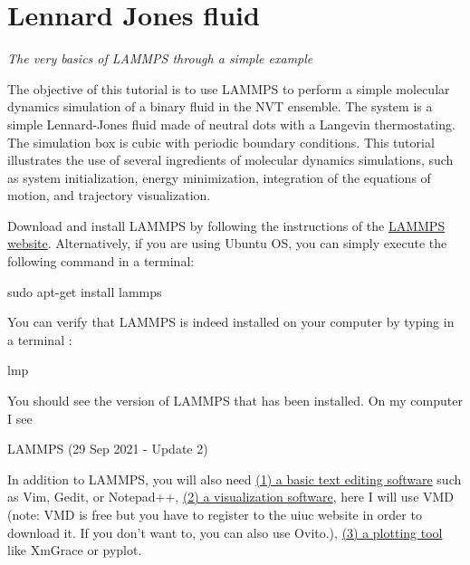 \chapter{Lennard Jones fluid}

\vspace{-1cm} \noindent \textcolor{graytitle}{\textit{{\Large The very basics of LAMMPS through a simple example}}\vspace{0.5cm} }

\noindent The objective of this tutorial is to use
LAMMPS to perform a simple molecular dynamics simulation
of a binary fluid in the NVT ensemble. The system is a simple Lennard-Jones fluid
made of neutral dots with a Langevin thermostating. The
simulation box is cubic with periodic boundary conditions.
This tutorial illustrates the use of several ingredients of
molecular dynamics simulations, such as system initialization,
energy minimization, integration of the equations of motion,
and trajectory visualization.

Download and install LAMMPS by following the instructions of the \href{https://lammps.sandia.gov}{LAMMPS website}.
Alternatively, if you are using Ubuntu OS, you can simply execute the
following command in a terminal:

\begin{lcverbatim}
sudo apt-get install lammps
\end{lcverbatim}

\noindent You can verify that LAMMPS is indeed installed on your
computer by typing in a terminal :

\begin{lcverbatim}
lmp
\end{lcverbatim}

\noindent You should see the version of LAMMPS that has been
installed. On my computer I see

\begin{lcverbatim}
LAMMPS (29 Sep 2021 - Update 2)
\end{lcverbatim}

\noindent In addition to LAMMPS, you will also need \href{https://help.gnome.org/users/gedit/stable/}{(1) a basic text editing software}
such as Vim, Gedit, or Notepad++, \href{https://www.ks.uiuc.edu/Research/vmd/}{(2) a visualization software}, here I
will use VMD (note: VMD is free but you have to register to
the uiuc website in order to download it. If you don't want
to, you can also use Ovito.), \href{https://plasma-gate.weizmann.ac.il/Grace/}{(3) a plotting tool} like
XmGrace or pyplot.

